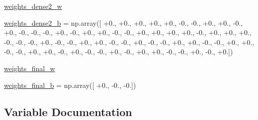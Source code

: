 \begin{DoxyCompactItemize}
\item 
\hyperlink{namespacepybullet-gym_1_1pybulletgym_1_1tests_1_1roboschool_1_1agents_1_1_hopper_py_bullet_env__v0__2017may_a818a510223b8ec70ee72e4204c946360}{weights\+\_\+dense2\+\_\+w}
\item 
\hyperlink{namespacepybullet-gym_1_1pybulletgym_1_1tests_1_1roboschool_1_1agents_1_1_hopper_py_bullet_env__v0__2017may_aec5b127be6bf8845ba11d5328b78fab5}{weights\+\_\+dense2\+\_\+b} = np.\+array(\mbox{[} +0., +0., +0., +0., +0., -\/0., -\/0., +0., +0., -\/0., +0., -\/0., -\/0., -\/0., +0., -\/0., +0., +0., -\/0., -\/0., +0., +0., +0., +0., -\/0., +0., +0., +0., -\/0., -\/0., -\/0., +0., -\/0., -\/0., +0., +0., -\/0., -\/0., +0., -\/0., -\/0., +0., +0., -\/0., -\/0., +0., +0., -\/0., -\/0., +0., +0., -\/0., +0., -\/0., -\/0., +0., -\/0., +0., +0., -\/0., -\/0., +0., -\/0., +0.\mbox{]})
\item 
\hyperlink{namespacepybullet-gym_1_1pybulletgym_1_1tests_1_1roboschool_1_1agents_1_1_hopper_py_bullet_env__v0__2017may_a5eab38d55a52b36d2b76a0954f078097}{weights\+\_\+final\+\_\+w}
\item 
\hyperlink{namespacepybullet-gym_1_1pybulletgym_1_1tests_1_1roboschool_1_1agents_1_1_hopper_py_bullet_env__v0__2017may_abb57a6e6a31ba91ce3e4cf0ec85862cf}{weights\+\_\+final\+\_\+b} = np.\+array(\mbox{[} +0., -\/0., -\/0.\mbox{]})
\end{DoxyCompactItemize}


\subsection{Variable Documentation}
